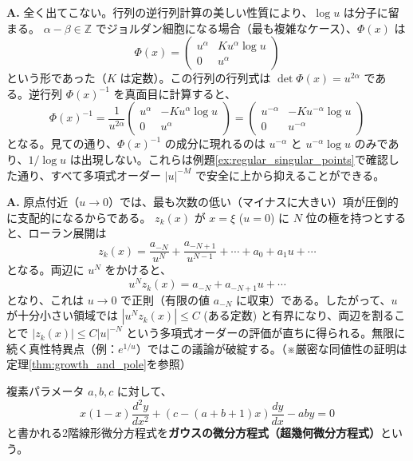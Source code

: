 \begin{Q}
\textbf{A.} 全く出てこない。行列の逆行列計算の美しい性質により、$\log u$ は分子に留まる。
$\alpha - \beta \in \mathbb{Z}$ でジョルダン細胞になる場合（最も複雑なケース）、$\Phi(x)$ は
\[
\Phi(x) = 
\begin{pmatrix}
    u^\alpha & K u^\alpha \log u \\
    0 & u^\alpha
\end{pmatrix}
\]
という形であった（$K$ は定数）。この行列の行列式は $\det \Phi(x) = u^{2\alpha}$ である。逆行列 $\Phi(x)^{-1}$ を真面目に計算すると、
\[
\Phi(x)^{-1} = \frac{1}{u^{2\alpha}}
\begin{pmatrix}
    u^\alpha & -K u^\alpha \log u \\
    0 & u^\alpha
\end{pmatrix}
=
\begin{pmatrix}
    u^{-\alpha} & -K u^{-\alpha} \log u \\
    0 & u^{-\alpha}
\end{pmatrix}
\]
となる。見ての通り、$\Phi(x)^{-1}$ の成分に現れるのは $u^{-\alpha}$ と $u^{-\alpha} \log u$ のみであり、$1/\log u$ は出現しない。これらは例題\ref{ex:regular_singular_points}で確認した通り、すべて多項式オーダー $|u|^{-M}$ で安全に上から抑えることができる。
\end{Q}

\begin{Q}
\textbf{A.} 原点付近（$u \to 0$）では、最も次数の低い（マイナスに大きい）項が圧倒的に支配的になるからである。
$z_k(x)$ が $x=\xi$ ($u=0$) に $N$ 位の極を持つとすると、ローラン展開は
\[
z_k(x) = \frac{a_{-N}}{u^N} + \frac{a_{-N+1}}{u^{N-1}} + \cdots + a_0 + a_1 u + \cdots
\]
となる。両辺に $u^N$ をかけると、
\[
u^N z_k(x) = a_{-N} + a_{-N+1}u + \cdots 
\]
となり、これは $u \to 0$ で正則（有限の値 $a_{-N}$ に収束）である。したがって、$u$ が十分小さい領域では $|u^N z_k(x)| \le C$ (ある定数) と有界になり、両辺を割ることで $|z_k(x)| \le C|u|^{-N}$ という多項式オーダーの評価が直ちに得られる。無限に続く真性特異点（例：$e^{1/u}$）ではこの議論が破綻する。（※厳密な同値性の証明は定理\ref{thm:growth_and_pole}を参照）
\end{Q}
\begin{definition}[ガウスの微分方程式]
    複素パラメータ $a, b, c$ に対して、
    \begin{equation}\label{eq:gauss_hypergeometric}
    x(1-x)\frac{d^{2}y}{dx^{2}}+(c-(a+b+1)x)\frac{dy}{dx}-aby = 0
    \end{equation}
    と書かれる2階線形微分方程式を\textbf{ガウスの微分方程式（超幾何微分方程式）}という。
\end{definition}

